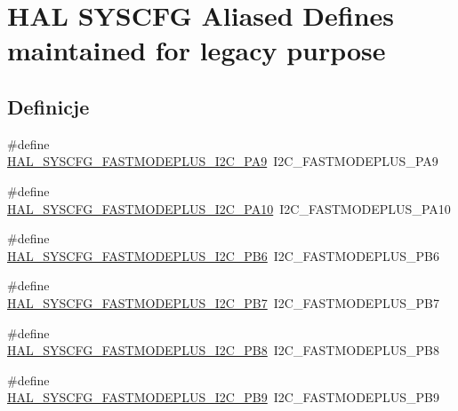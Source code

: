 \hypertarget{group___h_a_l___s_y_s_c_f_g___aliased___defines}{}\section{H\+AL S\+Y\+S\+C\+FG Aliased Defines maintained for legacy purpose}
\label{group___h_a_l___s_y_s_c_f_g___aliased___defines}
\subsection*{Definicje}
\begin{DoxyCompactItemize}
\item 
\#define \hyperlink{group___h_a_l___s_y_s_c_f_g___aliased___defines_gab49ca938ca8481b3bd783423f840c1bd}{H\+A\+L\+\_\+\+S\+Y\+S\+C\+F\+G\+\_\+\+F\+A\+S\+T\+M\+O\+D\+E\+P\+L\+U\+S\+\_\+\+I2\+C\+\_\+\+P\+A9}~I2\+C\+\_\+\+F\+A\+S\+T\+M\+O\+D\+E\+P\+L\+U\+S\+\_\+\+P\+A9
\item 
\#define \hyperlink{group___h_a_l___s_y_s_c_f_g___aliased___defines_ga51ca865a9860b7a43fbb46fb768e3657}{H\+A\+L\+\_\+\+S\+Y\+S\+C\+F\+G\+\_\+\+F\+A\+S\+T\+M\+O\+D\+E\+P\+L\+U\+S\+\_\+\+I2\+C\+\_\+\+P\+A10}~I2\+C\+\_\+\+F\+A\+S\+T\+M\+O\+D\+E\+P\+L\+U\+S\+\_\+\+P\+A10
\item 
\#define \hyperlink{group___h_a_l___s_y_s_c_f_g___aliased___defines_ga615cfdee08ad61f7b1581775e4e0385e}{H\+A\+L\+\_\+\+S\+Y\+S\+C\+F\+G\+\_\+\+F\+A\+S\+T\+M\+O\+D\+E\+P\+L\+U\+S\+\_\+\+I2\+C\+\_\+\+P\+B6}~I2\+C\+\_\+\+F\+A\+S\+T\+M\+O\+D\+E\+P\+L\+U\+S\+\_\+\+P\+B6
\item 
\#define \hyperlink{group___h_a_l___s_y_s_c_f_g___aliased___defines_gaacdf5fce976c3d425f3aac760f4dc90d}{H\+A\+L\+\_\+\+S\+Y\+S\+C\+F\+G\+\_\+\+F\+A\+S\+T\+M\+O\+D\+E\+P\+L\+U\+S\+\_\+\+I2\+C\+\_\+\+P\+B7}~I2\+C\+\_\+\+F\+A\+S\+T\+M\+O\+D\+E\+P\+L\+U\+S\+\_\+\+P\+B7
\item 
\#define \hyperlink{group___h_a_l___s_y_s_c_f_g___aliased___defines_gad8342aebd8090a8777d84165d5726b62}{H\+A\+L\+\_\+\+S\+Y\+S\+C\+F\+G\+\_\+\+F\+A\+S\+T\+M\+O\+D\+E\+P\+L\+U\+S\+\_\+\+I2\+C\+\_\+\+P\+B8}~I2\+C\+\_\+\+F\+A\+S\+T\+M\+O\+D\+E\+P\+L\+U\+S\+\_\+\+P\+B8
\item 
\#define \hyperlink{group___h_a_l___s_y_s_c_f_g___aliased___defines_ga8ace04770933b1fbf1b0e28abd6f3a25}{H\+A\+L\+\_\+\+S\+Y\+S\+C\+F\+G\+\_\+\+F\+A\+S\+T\+M\+O\+D\+E\+P\+L\+U\+S\+\_\+\+I2\+C\+\_\+\+P\+B9}~I2\+C\+\_\+\+F\+A\+S\+T\+M\+O\+D\+E\+P\+L\+U\+S\+\_\+\+P\+B9

\end{DoxyCompactItemize}
